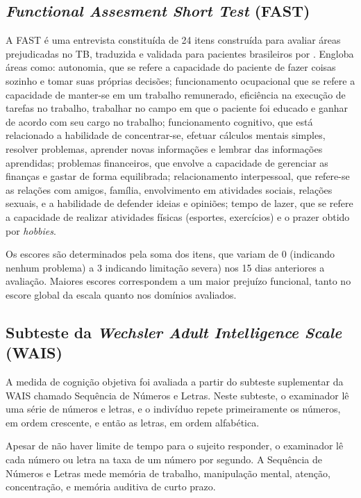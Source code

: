 \documentclass[chapter=TITLE,oneside,12pt,a4paper,english,brazil]{abntex2} %
\begin{document}
    \subsection{\textit{Functional Assesment Short Test} (FAST)}\label{sec:fast}

    A FAST é uma entrevista constituída de 24 itens construída para avaliar
    áreas prejudicadas no TB, traduzida e validada para pacientes brasileiros
    por \textcite{cacilhas_validity_2009}.
    Engloba áreas como: autonomia, que se refere a capacidade do paciente de
    fazer coisas sozinho e tomar suas próprias decisões; funcionamento
    ocupacional que se refere a capacidade de manter-se em um trabalho
    remunerado, eficiência na execução de tarefas no trabalho, trabalhar
    no campo em que o paciente foi educado e ganhar de acordo com seu cargo
    no trabalho; funcionamento cognitivo, que está relacionado a habilidade
    de concentrar-se, efetuar cálculos mentais simples, resolver problemas,
    aprender novas informações e lembrar das informações aprendidas; problemas
    financeiros, que envolve a capacidade de gerenciar as finanças e gastar de
    forma equilibrada; relacionamento interpessoal, que refere-se as relações
    com amigos, família, envolvimento em atividades sociais, relações sexuais,
    e a habilidade de defender ideias e opiniões; tempo de lazer, que se refere
    a capacidade de realizar atividades físicas (esportes, exercícios) e o prazer
    obtido por \textit{hobbies}.

    Os escores são determinados pela soma dos itens, que variam de
    0 (indicando nenhum problema) a 3 indicando limitação severa)
    nos 15 dias anteriores a avaliação.
    Maiores escores correspondem a um maior prejuízo funcional,
    tanto no escore global da escala quanto nos domínios avaliados.

    \subsection{Subteste da \textit{Wechsler Adult Intelligence Scale} (WAIS)}\label{sec:wais}

    A medida de cognição objetiva foi avaliada a partir do subteste suplementar da WAIS
    chamado Sequência de Números e Letras. Neste subteste, o examinador lê uma série
    de números e letras, e o indivíduo repete primeiramente os números, em ordem
    crescente, e então as letras, em ordem alfabética.

    Apesar de não haver limite de tempo para o sujeito responder, o examinador lê
    cada número ou letra na taxa de um número por segundo. A Sequência de Números
    e Letras mede memória de trabalho, manipulação mental, atenção, concentração,
    e memória auditiva de curto prazo. \parencite{wechsler_wais_2004}
\end{document}
